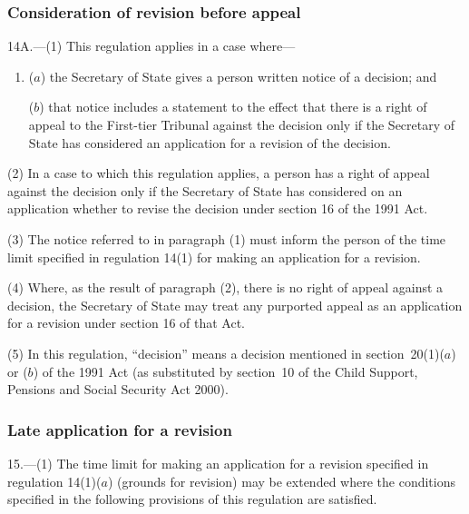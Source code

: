 \documentclass[12pt,a4paper]{article}
\begin{document}
\subsubsection[14A. Consideration of revision before appeal]{Consideration of revision before appeal}

14A.---(1)  This regulation applies in a case where—
\begin{enumerate}\item[]
($a$) the Secretary of State gives a person written notice of a decision; and

($b$) that notice includes a statement to the effect that there is a right of appeal to the First-tier Tribunal against the decision only if the Secretary of State has considered an application for a revision of the decision.
\end{enumerate}

(2) In a case to which this regulation applies, a person has a right of appeal against the decision only if the Secretary of State has considered on an application whether to revise the decision under section 16 of the 1991 Act.

(3) The notice referred to in paragraph (1) must inform the person of the time limit specified in regulation 14(1) for making an application for a revision.

(4) Where, as the result of paragraph (2), there is no right of appeal against a decision, the Secretary of State may treat any purported appeal as an application for a revision under section 16 of that Act.

(5) In this regulation, “decision” means a decision mentioned in section~20(1)($a$)  or ($b$)  of the 1991 Act (as substituted by section~10 of the Child Support, Pensions and Social Security Act 2000).


\subsubsection[15. Late application for a revision]{Late application for a revision}

15.---(1)  The time limit for making an application for a revision specified in regulation 14(1)($a$)  (grounds for revision) may be extended where the conditions specified in the following provisions of this regulation are satisfied.
\end{document}
